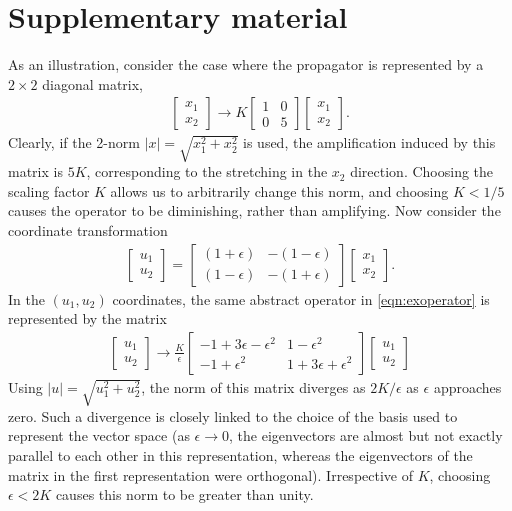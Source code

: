 \documentclass[letterpaper,10pt,prl,twocolumn,aps,reprint,superscriptaddress]{revtex4-1}
\begin{document}
\section*{Supplementary material}
As an illustration, consider the case where the propagator is represented by a $2\times 2$ diagonal matrix,
\begin{align}
 \begin{bmatrix} x_1 \\ x_2 \end{bmatrix}
 \to
K \begin{bmatrix} 1 & 0 \\ 0 & 5 \end{bmatrix}
 \begin{bmatrix} x_1 \\ x_2 \end{bmatrix}.
 \label{eqn:exoperator}
\end{align}
Clearly, if the 2-norm $|x| = \sqrt{x_1^2 +x_2^2}$ is used, the amplification induced by this matrix is $5K$, corresponding to the stretching in the $x_2$ direction. Choosing the scaling factor $K$ allows us to arbitrarily change this norm, and choosing $K<1/5$ causes the operator to be diminishing, rather than amplifying. Now consider the coordinate transformation
\begin{align}
 \begin{bmatrix} u_1 \\ u_2 \end{bmatrix}
 =
 \begin{bmatrix} (1+\epsilon) & -(1-\epsilon) \\ (1-\epsilon) & -(1+\epsilon) \end{bmatrix}
 \begin{bmatrix} x_1 \\ x_2 \end{bmatrix}.
 \label{eqn:transform}
\end{align}
In the $(u_1, u_2)$ coordinates, the same abstract operator in \eqref{eqn:exoperator} is represented by the matrix
\begin{align}
 \begin{bmatrix} u_1 \\ u_2 \end{bmatrix}
 \to \frac{K}{\epsilon}
 \begin{bmatrix} -1+3\epsilon-\epsilon^2 & 1-\epsilon^2 \\ -1+\epsilon^2 & 1+3\epsilon+\epsilon^2 \end{bmatrix}
 \begin{bmatrix} u_1 \\ u_2 \end{bmatrix}
\end{align}
Using $|u| = \sqrt{u_1^2 + u_2^2}$, the norm of this matrix diverges as $2K/\epsilon$ as $\epsilon$ approaches zero. Such a divergence is closely linked to the choice of the basis used to represent the vector space (as $\epsilon\to 0$, the eigenvectors are almost but not exactly parallel to each other in this representation, whereas the eigenvectors of the matrix in the first representation were orthogonal). Irrespective of $K$, choosing $\epsilon < 2K$ causes this norm to be greater than unity. 
\end{document}
